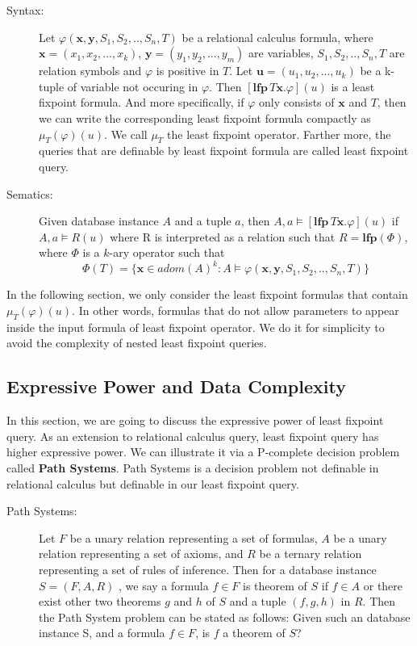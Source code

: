 \begin{description}

\item[Syntax:]
Let $\varphi(\textbf{x},\textbf{y}, S_1,S_2,..,S_n, T)$ be a relational calculus formula, where $\textbf{x}=(x_1, x_2,...,x_k)$, $\textbf{y}=(y_1,y_2,...,y_m)$ are variables, $S_1,S_2,..,S_n, T$ are relation symbols and $\varphi$ is positive in $T$. Let $\textbf{u}=(u_1, u_2,...,u_k)$ be a k-tuple of variable not occuring in $\varphi$. Then $[\textbf{lfp}\,T\textbf{x}.\varphi](u)$ is a least fixpoint formula. And more specifically, if $\varphi$ only consists of $\textbf{x}$ and $T$, then we can write the corresponding least fixpoint formula compactly as $\mu_T(\varphi)(u)$. We call $\mu_T$ the least fixpoint operator. Farther more, the queries that are definable by least fixpoint formula are called least fixpoint query.\\

\item[Sematics:]
Given database instance $A$ and a tuple $a$, then $A, a \models [\textbf{lfp}\,T\textbf{x}.\varphi](u)$ if $A, a \models R(u)$ where R is interpreted as a relation such that $R=\textbf{lfp}(\Phi)$, where $\Phi$ is a $k$-ary operator such that
$$ \Phi(T) = \{\textbf{x}\in adom(A)^k: A\models \varphi(\textbf{x},\textbf{y},S_1,S_2,..,S_n,T)\}$$ 

\end{description}

In the following section, we only consider the least fixpoint formulas that contain $\mu_T(\varphi)(u)$. In other words, formulas that do not allow parameters to appear inside the input formula of least fixpoint operator. We do it for simplicity to avoid the complexity of nested least fixpoint queries.

\subsection{Expressive Power and Data Complexity}

In this section, we are going to discuss the expressive power of least fixpoint query. As an extension to relational calculus query, least fixpoint query has higher expressive power. We can illustrate it via a P-complete decision problem called \textbf{Path Systems}\cite{Cook}. Path Systems is a decision problem not definable in relational calculus but definable in our least fixpoint query. \\

\begin{description}
\item[Path Systems:]
Let $F$ be a unary relation representing a set of formulas, $A$ be a unary relation representing a set of axioms, and $R$ be a ternary relation representing a set of rules of inference. Then for a database instance $S = (F, A, R)$ , we say a formula $f\in F$ is theorem of $S$ if $f\in A$ or there exist other two theorems $g$ and $h$ of $S$ and a tuple $(f, g, h)$ in $R$. Then the Path System problem can be stated as follows: Given such an database instance S, and a formula $f\in F$, is $f$ a theorem of $S$?
\end{description}

